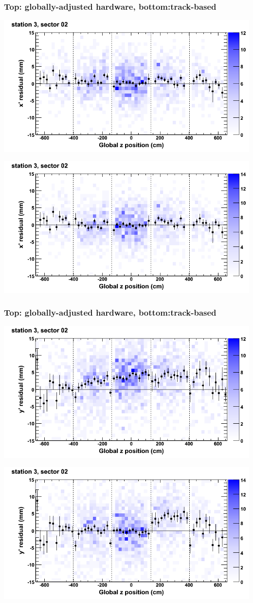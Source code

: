 \documentclass[compress]{beamer}
\begin{document}
\begin{frame}
\frametitle{Top: globally-adjusted hardware, bottom:track-based}
\includegraphics[width=0.7\linewidth]{NOV4_mapplots_HW/DTvsz_st3sec02_x.png}

\includegraphics[width=0.7\linewidth]{NOV4_mapplots/DTvsz_st3sec02_x.png}
\end{frame}

\begin{frame}
\frametitle{Top: globally-adjusted hardware, bottom:track-based}
\includegraphics[width=0.7\linewidth]{NOV4_mapplots_HW/DTvsz_st3sec02_y.png}

\includegraphics[width=0.7\linewidth]{NOV4_mapplots/DTvsz_st3sec02_y.png}
\end{frame}
\end{document}
